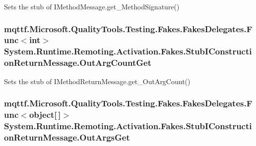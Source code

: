 Sets the stub of I\-Method\-Message.\-get\-\_\-\-Method\-Signature()

\hypertarget{class_system_1_1_runtime_1_1_remoting_1_1_activation_1_1_fakes_1_1_stub_i_construction_return_message_a34f226229656bc11a1b75cf1b7a2d281}{
\subsubsection[{Out\-Arg\-Count\-Get}]{\setlength{\rightskip}{0pt plus 5cm}mqttf.\-Microsoft.\-Quality\-Tools.\-Testing.\-Fakes.\-Fakes\-Delegates.\-Func$<$int$>$ System.\-Runtime.\-Remoting.\-Activation.\-Fakes.\-Stub\-I\-Construction\-Return\-Message.\-Out\-Arg\-Count\-Get}}\label{class_system_1_1_runtime_1_1_remoting_1_1_activation_1_1_fakes_1_1_stub_i_construction_return_message_a34f226229656bc11a1b75cf1b7a2d281}


Sets the stub of I\-Method\-Return\-Message.\-get\-\_\-\-Out\-Arg\-Count()

\hypertarget{class_system_1_1_runtime_1_1_remoting_1_1_activation_1_1_fakes_1_1_stub_i_construction_return_message_aec1d253d758b7cf3d4bdb35299e74062}{
\subsubsection[{Out\-Args\-Get}]{\setlength{\rightskip}{0pt plus 5cm}mqttf.\-Microsoft.\-Quality\-Tools.\-Testing.\-Fakes.\-Fakes\-Delegates.\-Func$<$object\mbox{[}$\,$\mbox{]}$>$ System.\-Runtime.\-Remoting.\-Activation.\-Fakes.\-Stub\-I\-Construction\-Return\-Message.\-Out\-Args\-Get}}\label{class_system_1_1_runtime_1_1_remoting_1_1_activation_1_1_fakes_1_1_stub_i_construction_return_message_aec1d253d758b7cf3d4bdb35299e74062}


